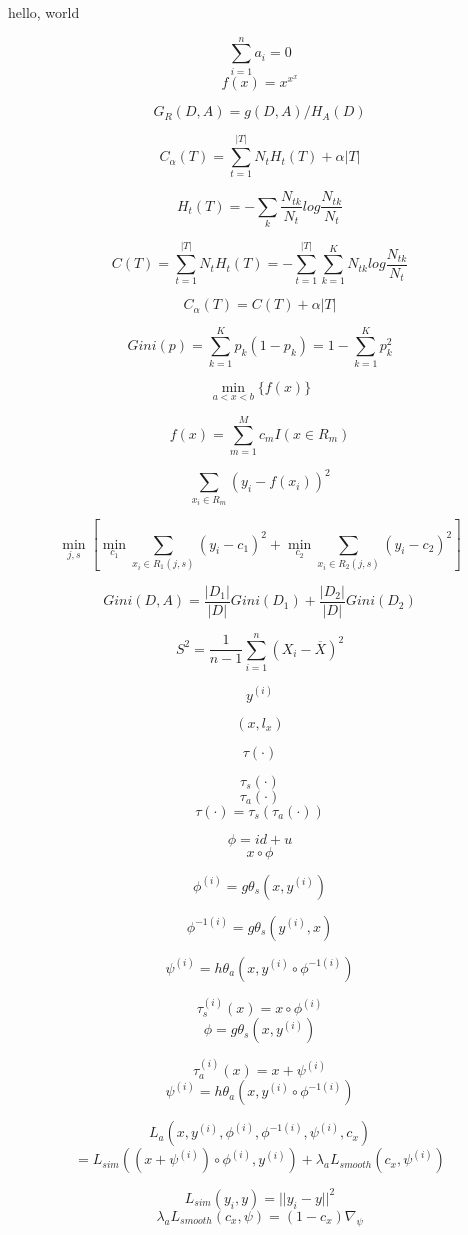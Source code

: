 \documentclass{article}
\begin{document}
hello, world

$$\sum_{i=1}^n a_i=0$$
$$f(x)=x^{x^x}$$

$$G_R(D,A)=g(D,A)/H_A(D)$$

$$C_\alpha(T)=\sum_{t=1}^{|T|} N_tH_t(T)+\alpha|T|$$

$$H_t(T)=-\sum_k \frac{N_{tk}}{N_t}log\frac{N_{tk}}{N_t}$$

$$C(T)=\sum_{t=1}^{|T|} N_t H_t (T)=-\sum_{t=1}^{|T|} \sum_{k=1}^{K} N_{tk} log \frac {N_{tk}}{N_t}$$

$$C_\alpha(T)=C(T)+\alpha|T|$$

$$Gini(p)=\sum_{k=1}^{K} p_k (1-p_k)=1-\sum_{k=1}^K p_{k}^{2}$$

$$\min \limits_{a<x<b}\{f(x)\}$$

$$f(x)=\sum_{m=1}^M c_m I(x\in R_m)$$

$$\sum_{x_i\in R_m} (y_i-f(x_i))^2$$

$$\min \limits_{j,s} [\min \limits_{c_1} \sum_{x_i\in R_1(j,s)} (y_i-c_1)^2+\min \limits_{c_2} \sum_{x_i \in R_2(j,s)} (y_i-c_2)^2]$$

$$Gini(D,A)=\frac{|D_1|}{|D|} Gini(D_1)+\frac{|D_2|}{|D|}Gini(D_2)$$

$$ S^{2} = \frac{1}{n-1}\sum_{i=1}^n (X_i - \overline{X})^{2}$$


$${y^{(i)}}$$

$$ (x, l_x)$$

$$ \tau(\cdot) $$

$$ \tau_{s}(\cdot) $$
$$ \tau_{a}(\cdot) $$
$$ \tau(\cdot) =  \tau_{s}(\tau_{a}(\cdot)) $$

$$\phi = id + u $$
$$x \circ \phi$$

$$ \phi^{(i)} = g\theta_{s}(x, y^{(i)}) $$

$$ \phi^{-1(i)} = g\theta_{s}(y^{(i)}, x) $$

$$  \psi^{(i)} = h\theta_{a}(x, y^{(i)}\circ\phi^{-1(i)}) $$

$$ \tau_{s}^{(i)}(x) = x\circ\phi^{(i)} $$
$$ \phi= g\theta_{s}(x, y^{(i)}) $$

$$ \tau_{a}^{(i)}(x) = x + \psi^{(i)} $$
$$ \psi^{(i)} = h\theta_{a}(x, y^{(i)}\circ\phi^{-1(i)}) $$


$$ L_a(x, y^{(i)}, \phi^{(i)}, \phi^{-1(i)}, \psi^{(i)}, c_x) $$
$$ = L_{sim}((x + \psi^{(i)}) \circ \phi^{(i)}, y^{(i)}) + \lambda_{a}L_{smooth}(c_x, \psi^{(i)}) $$

$$ L_{sim}(y_i, y) = ||y_i - y||^2 $$
$$\lambda_{a}L_{smooth}(c_x, \psi) = (1-c_x)\nabla_\psi $$
\end{document}
